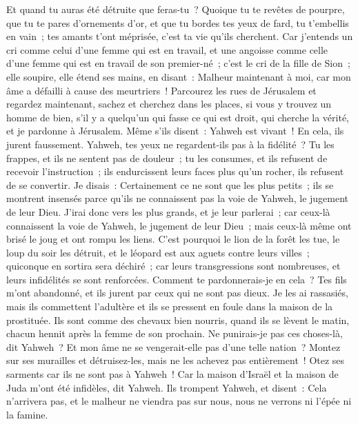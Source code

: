 \begin{multicols}{2}
Et quand tu auras été détruite que feras-tu~? Quoique tu te revêtes de pourpre, que tu te pares d'ornements d'or, et que tu bordes tes yeux de fard, tu t'embellis en vain~; tes amants t'ont méprisée, c'est ta vie qu'ils cherchent.
Car j'entends un cri comme celui d'une femme qui est en travail, et une angoisse comme celle d'une femme qui est en travail de son premier-né~; c'est le cri de la fille de Sion~; elle soupire, elle étend ses mains, en disant~: Malheur maintenant à moi, car mon âme a défailli à cause des meurtriers~!
\VerseOne{}Parcourez les rues de Jérusalem et regardez maintenant, sachez et cherchez dans les places, si vous y trouvez un homme de bien, s'il y a quelqu'un qui fasse ce qui est droit, qui cherche la vérité, et je pardonne à Jérusalem.
Même s'ils disent~: Yahweh est vivant~! En cela, ils jurent faussement.
Yahweh, tes yeux ne regardent-ils pas à la fidélité~? Tu les frappes, et ils ne sentent pas de douleur~; tu les consumes, et ils refusent de recevoir l'instruction~; ils endurcissent leurs faces plus qu'un rocher, ils refusent de se convertir.
Je disais~: Certainement ce ne sont que les plus petits~; ils se montrent insensés parce qu'ils ne connaissent pas la voie de Yahweh, le jugement de leur Dieu.
J'irai donc vers les plus grands, et je leur parlerai~; car ceux-là connaissent la voie de Yahweh, le jugement de leur Dieu~; mais ceux-là même ont brisé le joug et ont rompu les liens.
C'est pourquoi le lion de la forêt les tue, le loup du soir les détruit, et le léopard est aux aguets contre leurs villes~; quiconque en sortira sera déchiré~; car leurs transgressions sont nombreuses, et leurs infidélités se sont renforcées.
Comment te pardonnerais-je en cela~? Tes fils m'ont abandonné, et ils jurent par ceux qui ne sont pas dieux. Je les ai rassasiés, mais ils commettent l'adultère et ils se pressent en foule dans la maison de la prostituée.
Ils sont comme des chevaux bien nourris, quand ils se lèvent le matin, chacun hennit après la femme de son prochain.
Ne punirais-je pas ces choses-là, dit Yahweh~? Et mon âme ne se vengerait-elle pas d'une telle nation~?
Montez sur ses murailles et détruisez-les, mais ne les achevez pas entièrement~! Otez ses sarments car ils ne sont pas à Yahweh~!
Car la maison d'Israël et la maison de Juda m'ont été infidèles, dit Yahweh.
Ils trompent Yahweh, et disent~: Cela n'arrivera pas, et le malheur ne viendra pas sur nous, nous ne verrons ni l'épée ni la famine.

\end{multicols}
